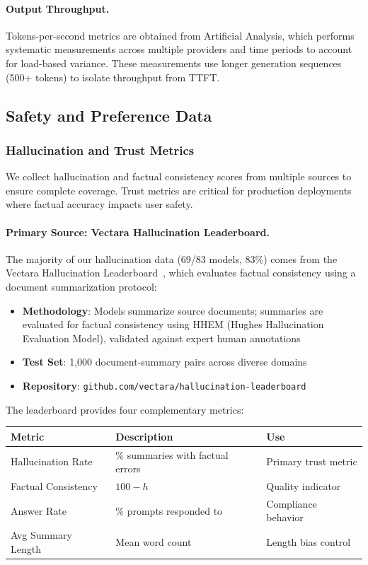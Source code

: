 \paragraph{Output Throughput.}
Tokens-per-second metrics are obtained from Artificial Analysis, which performs systematic measurements across multiple providers and time periods to account for load-based variance. These measurements use longer generation sequences (500+ tokens) to isolate throughput from TTFT.

\subsection{Safety and Preference Data}

\subsubsection{Hallucination and Trust Metrics}

We collect hallucination and factual consistency scores from multiple sources to ensure complete coverage. Trust metrics are critical for production deployments where factual accuracy impacts user safety.

\paragraph{Primary Source: Vectara Hallucination Leaderboard.}
The majority of our hallucination data (69/83 models, 83\%) comes from the Vectara Hallucination Leaderboard~\cite{vectara2024hallucination}, which evaluates factual consistency using a document summarization protocol:
%
\begin{itemize}[nosep]
\item \textbf{Methodology}: Models summarize source documents; summaries are evaluated for factual consistency using HHEM (Hughes Hallucination Evaluation Model), validated against expert human annotations
\item \textbf{Test Set}: 1,000 document-summary pairs across diverse domains
\item \textbf{Repository}: \texttt{github.com/vectara/hallucination-leaderboard}
\end{itemize}

The leaderboard provides four complementary metrics:
%
\begin{table}[h]
\centering
\small
\begin{tabular}{lll}
\toprule
\textbf{Metric} & \textbf{Description} & \textbf{Use} \\
\midrule
Hallucination Rate & \% summaries with factual errors & Primary trust metric \\
Factual Consistency & $100 - h$ & Quality indicator \\
Answer Rate & \% prompts responded to & Compliance behavior \\
Avg Summary Length & Mean word count & Length bias control \\
\bottomrule
\end{tabular}
\end{table}

